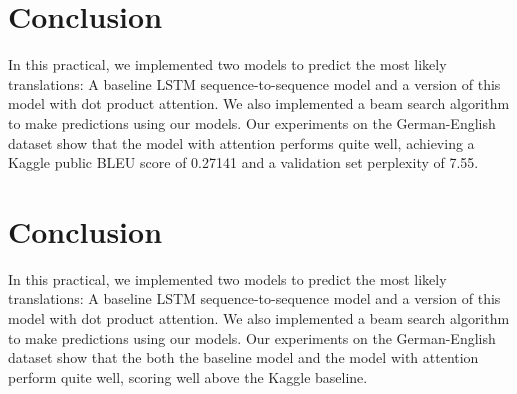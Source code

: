 \documentclass[11pt]{article}
\begin{document}
\section{Conclusion}
In this practical, we implemented two models to predict the most likely translations: A baseline LSTM sequence-to-sequence model and a version of this model with dot product attention. We also implemented a beam search algorithm to make predictions using our models. Our experiments on the German-English dataset show that the model with attention performs quite well, achieving a Kaggle public BLEU score of 0.27141 and a validation set perplexity of 7.55.

\section{Conclusion}
In this practical, we implemented two models to predict the most likely translations: A baseline LSTM sequence-to-sequence model and a version of this model with dot product attention. We also implemented a beam search algorithm to make predictions using our models. Our experiments on the German-English dataset show that the both the baseline model and the model with attention perform quite well, scoring well above the Kaggle baseline.



\nocite{*}

\end{document}
